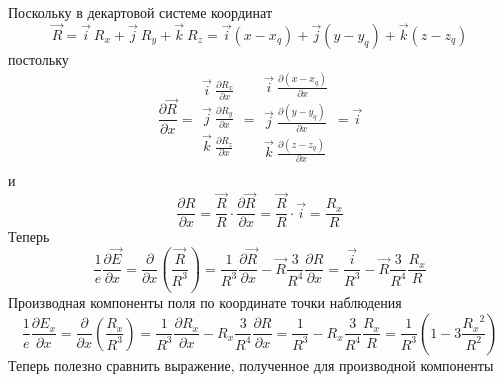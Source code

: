 \documentclass[11pt]{article}
\begin{document}
Поскольку в декартовой системе координат
\[\overrightarrow{R}=\overrightarrow{i}\ {{R}_{x}}+\overrightarrow{j}\ {{R}_{y}}+\overrightarrow{k}\ {{R}_{z}}=\overrightarrow{i}\left( x-{{x}_{q}} \right)+\overrightarrow{j}\left( y-{{y}_{q}} \right)+\overrightarrow{k}\left( z-{{z}_{q}} \right)\]
постольку
\[\frac{\partial \overrightarrow{R}}{\partial x}=\begin{matrix}
   \overrightarrow{i}\ \frac{\partial {{R}_{x}}}{\partial x}  \\
   \overrightarrow{j}\ \frac{\partial {{R}_{y}}}{\partial x}  \\
   \overrightarrow{k}\ \frac{\partial {{R}_{z}}}{\partial x}  \\
\end{matrix}=\begin{matrix}
   \overrightarrow{i}\ \frac{\partial \left( x-{{x}_{q}} \right)}{\partial x}  \\
   \overrightarrow{j}\ \frac{\partial \left( y-{{y}_{q}} \right)}{\partial x}  \\
   \overrightarrow{k}\ \frac{\partial \left( z-{{z}_{q}} \right)}{\partial x}  \\
\end{matrix}=\overrightarrow{i}\] и
\[\frac{\partial R}{\partial x}=\frac{\overrightarrow{R}}{R}\cdot \frac{\partial \overrightarrow{R}}{\partial x}=\frac{\overrightarrow{R}}{R}\cdot \overrightarrow{i}=\frac{{{R}_{x}}}{R}\]
Теперь
\[\frac{1}{e}\frac{\partial \overrightarrow{E}}{\partial x}=\frac{\partial }{\partial x}\left( \frac{\overrightarrow{R}}{{{R}^{3}}} \right)=\frac{1}{{{R}^{3}}}\frac{\partial \overrightarrow{R}}{\partial x}-\overrightarrow{R}\frac{3}{{{R}^{4}}}\frac{\partial R}{\partial x}=\frac{\overrightarrow{i}}{{{R}^{3}}}-\overrightarrow{R}\frac{3}{{{R}^{4}}}\frac{{{R}_{x}}}{R}\]
Производная компоненты поля по координате точки наблюдения
\[\frac{1}{e}\frac{\partial {{E}_{x}}}{\partial x}=\frac{\partial }{\partial x}\left( \frac{{{R}_{x}}}{{{R}^{3}}} \right)=\frac{1}{{{R}^{3}}}\frac{\partial {{R}_{x}}}{\partial x}-{{R}_{x}}\frac{3}{{{R}^{4}}}\frac{\partial R}{\partial x}=\frac{1}{{{R}^{3}}}-{{R}_{x}}\frac{3}{{{R}^{4}}}\frac{{{R}_{x}}}{R}=\frac{1}{{{R}^{3}}}\left( 1-3\frac{{{R}_{x}}^{2}}{{{R}^{2}}} \right)\]
Теперь полезно сравнить выражение, полученное для производной компоненты
\end{document}
